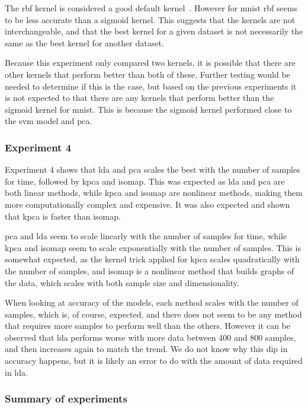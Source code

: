 The \gls{rbf} kernel is considered a good default kernel~\cite{scikit-learn}. However for \gls{mnist} \gls{rbf} seems to be less accurate than a sigmoid kernel. This suggests that the kernels are not interchangeable, and that the best kernel for a given dataset is not necessarily the same as the best kernel for another dataset.

Because this experiment only compared two kernels, it is possible that there are other kernels that perform better than both of these. Further testing would be needed to determine if this is the case, but based on the previous experiments it is not expected to that there are any kernels that perform better than the sigmoid kernel for \gls{mnist}. This is because the sigmoid kernel performed close to the \gls{svm} model and \gls{pca}.


\subsubsection{Experiment 4}\label{subsec:experiment-4}
Experiment 4 shows that \gls{lda} and \gls{pca} scales the best with the number of samples for time, followed by \gls{kpca} and \gls{isomap}. This was expected as \gls{lda} and \gls{pca} are both linear methods, while \gls{kpca} and \gls{isomap} are nonlinear methods, making them more computationally complex and expensive. It was also expected and shown that \gls{kpca} is faster than \gls{isomap}.

\gls{pca} and \gls{lda} seem to scale linearly with the number of samples for time, while \gls{kpca} and \gls{isomap} seem to scale exponentially with the number of samples. This is somewhat expected, as the kernel trick applied for \gls{kpca} scales quadratically with the number of samples, and \gls{isomap} is a nonlinear method that builds graphs of the data, which scales with both sample size and dimensionality.

When looking at accuracy of the models, each method scales with the number of samples, which is, of course, expected, and there does not seem to be any method that requires more samples to perform well than the others. However it can be observed that \gls{lda} performs worse with more data between 400 and 800 samples, and then increases again to match the trend. We do not know why this dip in accuracy happens, but it is likely an error to do with the amount of data required in \gls{lda}.




\subsubsection{Summary of experiments}\label{subsec:summary-of-experiments}
